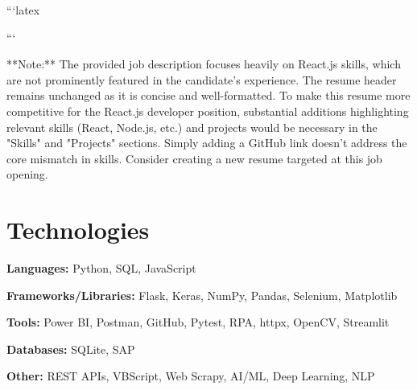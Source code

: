 ```latex

    \newcommand{\AND}{\unskip
        \cleaders\copy\ANDbox\hskip\wd\ANDbox
        \ignorespaces
    }
    \newsavebox\ANDbox
    \sbox\ANDbox{$|$}
    \vspace{5 pt - 0.3 cm}

```

**Note:**  The provided job description focuses heavily on React.js skills, which are not prominently featured in the candidate's experience.  The resume header remains unchanged as it is concise and well-formatted.  To make this resume more competitive for the React.js developer position,  substantial additions highlighting relevant skills (React, Node.js, etc.) and projects would be necessary in the "Skills" and "Projects" sections.  Simply adding a GitHub link doesn't address the core mismatch in skills.  Consider creating a new resume targeted at this job opening.

\section{Technologies}
\begin{onecolentry}
\textbf{Languages:} Python, SQL, JavaScript
\end{onecolentry}
\vspace{0.05 cm}
\begin{onecolentry}
\textbf{Frameworks/Libraries:} Flask, Keras,  NumPy, Pandas,  Selenium,  Matplotlib
\end{onecolentry}
\vspace{0.05 cm}
\begin{onecolentry}
\textbf{Tools:}  Power BI, Postman,  GitHub, Pytest,  RPA, httpx,  OpenCV,  Streamlit
\end{onecolentry}
\vspace{0.05 cm}
\begin{onecolentry}
\textbf{Databases:} SQLite, SAP
\end{onecolentry}
\vspace{0.05 cm}
\begin{onecolentry}
\textbf{Other:} REST APIs, VBScript,  Web Scrapy,  AI/ML, Deep Learning,  NLP
\end{onecolentry}


